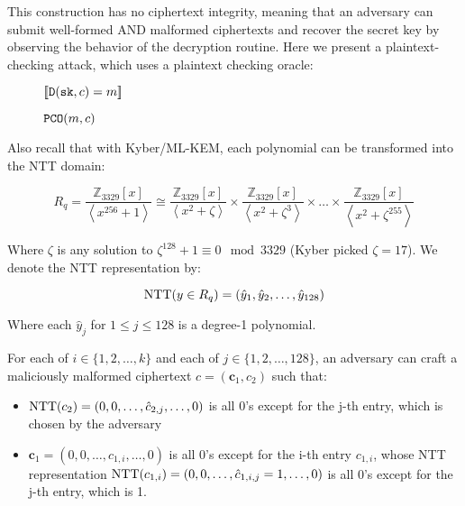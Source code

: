 \documentclass{article}
\begin{document}
This construction has no ciphertext integrity, meaning that an adversary can submit well-formed AND malformed ciphertexts and recover the secret key by observing the behavior of the decryption routine. Here we present a plaintext-checking attack, which uses a plaintext checking oracle:

\begin{figure}[H]
    \center
    \begin{minipage}{0.3\textwidth}
        \begin{algorithm}[H]
            \caption{$\texttt{PCO}(m, c)$}
            \begin{algorithmic}[1]
                \State \Return $[\![ \texttt{D}(\texttt{sk}, c) = m ]\!]$
            \end{algorithmic}
        \end{algorithm}
    \end{minipage}
\end{figure}

Also recall that with Kyber/ML-KEM, each polynomial can be transformed into the NTT domain:

\begin{equation*}
    R_q = \frac{\mathbb{Z}_{3329}[x]}{\left\langle x^{256} + 1 \right\rangle}
    \cong \frac{\mathbb{Z}_{3329}[x]}{\left\langle x^2 + \zeta \right\rangle}
    \times \frac{\mathbb{Z}_{3329}[x]}{\left\langle x^2 + \zeta^3 \right\rangle}
    \times \ldots
    \times \frac{\mathbb{Z}_{3329}[x]}{\left\langle x^2 + \zeta^{255} \right\rangle}
\end{equation*}

Where $\zeta$ is any solution to $\zeta^{128} + 1 \equiv 0 \mod 3329$ (Kyber picked $\zeta=17$). We denote the NTT representation by:

\begin{equation*}
    \operatorname{NTT}(y \in R_q) = (\hat{y}_1, \hat{y}_2, \ldots, \hat{y}_{128})
\end{equation*}

Where each $\hat{y}_j$ for $1 \leq j \leq 128$ is a degree-1 polynomial.

For each of $i \in \{1, 2, \ldots, k\}$ and each of $j \in \{1, 2, \ldots, 128\}$, an adversary can craft a maliciously malformed ciphertext $c = (\mathbf{c}_1, c_2)$ such that:

\begin{itemize}
    \item $\operatorname{NTT}(c_2) = (0, 0, \ldots, \hat{c}_{2, j}, \ldots, 0)$ is all 0's except for the j-th entry, which is chosen by the adversary
    \item $\mathbf{c}_1 = (0, 0, \ldots, c_{1, i}, \ldots, 0)$ is all 0's except for the i-th entry $c_{1, i}$, whose NTT representation $\operatorname{NTT}(c_{1, i}) = (0, 0, \ldots, \hat{c}_{1, i, j} = 1, \ldots, 0)$ is all 0's except for the j-th entry, which is 1.
\end{itemize}
\end{document}
